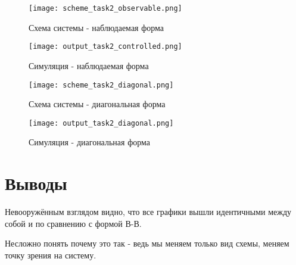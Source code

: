 \newpage
\begin{figure}[ht]
    \centering
    \texttt{[image: scheme\_task2\_observable.png]}
	\caption{Схема системы - наблюдаемая форма}
\end{figure}
\begin{figure}[ht]
    \centering
    \texttt{[image: output\_task2\_controlled.png]}
	\caption{Симуляция - наблюдаемая форма}
\end{figure}

\newpage
\begin{figure}[ht] 
    \centering
    \texttt{[image: scheme\_task2\_diagonal.png]}
	\caption{Схема системы - диагональная форма}
\end{figure}
\begin{figure}[ht]
    \centering
    \texttt{[image: output\_task2\_diagonal.png]}
	\caption{Симуляция - диагональная форма}
\end{figure}

\section{Выводы}

Невооружённым взглядом видно, что все графики вышли идентичными между собой и по сравнению с формой В-В.

Несложно понять почему это так - ведь мы меняем только вид схемы, меняем точку зрения на систему.

\endinput